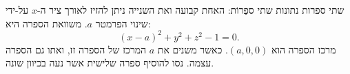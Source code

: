 \begin{surferPage}{שתי ספרות}
נתונות שתי ספֶרוֹת: האחת קבועה ואת השנייה ניתן להזיז לאורך ציר ה-$x$ על-ידי שינוי הפרמטר $a$.
משוואת הספרה היא:
\[(x-a)^2+y^2+z^2-1=0.\]
מרכז הספרה הוא $(a,0,0)$. כאשר משנים את $a$ המרכז של הספרה זז, ואתו גם הספרה עצמה.
נסו להוסיף ספרה שלישית אשר נעה בכיוון שונה.
\end{surferPage}
